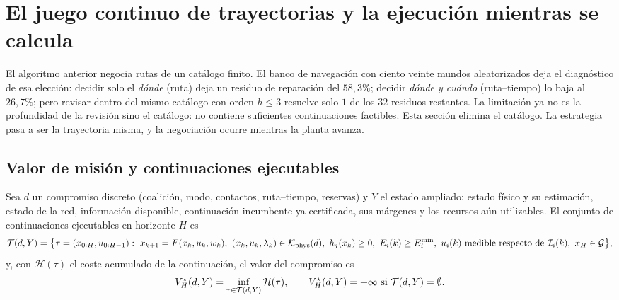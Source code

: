 \section{El juego continuo de trayectorias y la ejecución mientras se calcula}
\label{sec:continuacion}

El algoritmo anterior negocia rutas de un catálogo finito. El banco de
navegación con ciento veinte mundos aleatorizados \cite{mayorga2026compendio}
deja el diagnóstico de esa elección: decidir solo el \emph{dónde} (ruta) deja un
residuo de reparación del $58{,}3\%$; decidir \emph{dónde y cuándo}
(ruta--tiempo) lo baja al $26{,}7\%$; pero revisar dentro del mismo catálogo con
orden $h\le3$ resuelve solo $1$ de los $32$ residuos restantes. La limitación ya
no es la profundidad de la revisión sino el catálogo: no contiene suficientes
continuaciones factibles. Esta sección elimina el catálogo. La estrategia pasa a
ser la trayectoria misma, y la negociación ocurre mientras la planta avanza.

\subsection{Valor de misión y continuaciones ejecutables}

\begin{definicion}
\label{def:continuaciones}
Sea $d$ un compromiso discreto (coalición, modo, contactos, ruta--tiempo,
reservas) y $Y$ el estado ampliado: estado físico y su estimación, estado de la
red, información disponible, continuación incumbente ya certificada, sus
márgenes y los recursos aún utilizables. El conjunto de continuaciones
ejecutables en horizonte $H$ es
\begin{equation}
  \label{eq:T-continuaciones}
  \mathcal{T}(d,Y)=\bigl\{\tau=(x_{0:H},u_{0:H-1}):\ x_{k+1}=F(x_k,u_k,w_k),\
  (x_k,u_k,\lambda_k)\in\mathcal K_{\mathrm{phys}}(d),\ h_j(x_k)\ge0,\
  E_i(k)\ge E_i^{\min},\ u_i(k)\ \text{medible respecto de}\ \mathcal I_i(k),\
  x_H\in\mathcal G\bigr\},
\end{equation}
y, con $\mathcal H(\tau)$ el coste acumulado de la continuación, el valor del
compromiso es
\begin{equation}
  \label{eq:valor-mision}
  V_H^\star(d,Y)=\inf_{\tau\in\mathcal{T}(d,Y)}\mathcal H(\tau),\qquad
  V_H^\star(d,Y)=+\infty\ \text{si}\ \mathcal{T}(d,Y)=\emptyset .
\end{equation}
\end{definicion}

